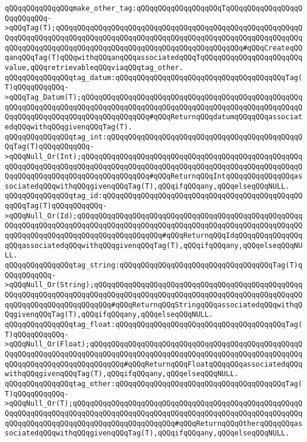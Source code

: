 \verb|qQQqqQQqqQQqqQQqmake_other_tag:qQQqqQQqqQQqqQQqqQQqTqQQqqQQqqQQqqQQqqQQqqQQqqQQq->qQQqTag(T);qQQqqQQqqQQqqQQqqQQqqQQqqQQqqQQqqQQqqQQqqQQqqQQqqQQqqQQqqQQqqQQqqQQqqQQqqQQqqQQqqQQqqQQqqQQqqQQqqQQqqQQqqQQqqQQqqQQqqQQqqQQqqQQqqQQqqQQqqQQqqQQqqQQqqQQqqQQqqQQqqQQqqQQqqQQqqQQqqQQqqQQq#qQQqCreateqQQqanqQQqTag(T)qQQqwithqQQqanqQQqassociatedqQQqTqQQqqQQqqQQqqQQqqQQqqQQqvalue,qQQqretrievableqQQqviaqQQqtag_other.|\newline
\newline
\verb|qQQqqQQqqQQqqQQqtag_datum:qQQqqQQqqQQqqQQqqQQqqQQqqQQqqQQqqQQqqQQqTag(T)qQQqqQQqqQQq->qQQqTag_Datum(T);qQQqqQQqqQQqqQQqqQQqqQQqqQQqqQQqqQQqqQQqqQQqqQQqqQQqqQQqqQQqqQQqqQQqqQQqqQQqqQQqqQQqqQQqqQQqqQQqqQQqqQQqqQQqqQQqqQQqqQQqqQQqqQQqqQQqqQQqqQQqqQQqqQQqqQQqqQQq#qQQqReturnqQQqdatumqQQqqQQqassociatedqQQqwithqQQqgivenqQQqTag(T).|\newline
\verb|qQQqqQQqqQQqqQQqtag_int:qQQqqQQqqQQqqQQqqQQqqQQqqQQqqQQqqQQqqQQqqQQqqQQqTag(T)qQQqqQQqqQQq->qQQqNull_Or(Int);qQQqqQQqqQQqqQQqqQQqqQQqqQQqqQQqqQQqqQQqqQQqqQQqqQQqqQQqqQQqqQQqqQQqqQQqqQQqqQQqqQQqqQQqqQQqqQQqqQQqqQQqqQQqqQQqqQQqqQQqqQQqqQQqqQQqqQQqqQQqqQQqqQQqqQQqqQQq#qQQqReturnqQQqIntqQQqqQQqqQQqqQQqassociatedqQQqwithqQQqgivenqQQqTag(T),qQQqifqQQqany,qQQqelseqQQqNULL.|\newline
\verb|qQQqqQQqqQQqqQQqtag_id:qQQqqQQqqQQqqQQqqQQqqQQqqQQqqQQqqQQqqQQqqQQqqQQqqQQqTag(T)qQQqqQQqqQQq->qQQqNull_Or(Id);qQQqqQQqqQQqqQQqqQQqqQQqqQQqqQQqqQQqqQQqqQQqqQQqqQQqqQQqqQQqqQQqqQQqqQQqqQQqqQQqqQQqqQQqqQQqqQQqqQQqqQQqqQQqqQQqqQQqqQQqqQQqqQQqqQQqqQQqqQQqqQQqqQQqqQQqqQQqqQQq#qQQqReturnqQQqIdqQQqqQQqqQQqqQQqqQQqassociatedqQQqwithqQQqgivenqQQqTag(T),qQQqifqQQqany,qQQqelseqQQqNULL.|\newline
\verb|qQQqqQQqqQQqqQQqtag_string:qQQqqQQqqQQqqQQqqQQqqQQqqQQqqQQqqQQqTag(T)qQQqqQQqqQQq->qQQqNull_Or(String);qQQqqQQqqQQqqQQqqQQqqQQqqQQqqQQqqQQqqQQqqQQqqQQqqQQqqQQqqQQqqQQqqQQqqQQqqQQqqQQqqQQqqQQqqQQqqQQqqQQqqQQqqQQqqQQqqQQqqQQqqQQqqQQqqQQqqQQqqQQqqQQq#qQQqReturnqQQqStringqQQqassociatedqQQqwithqQQqgivenqQQqTag(T),qQQqifqQQqany,qQQqelseqQQqNULL.|\newline
\verb|qQQqqQQqqQQqqQQqtag_float:qQQqqQQqqQQqqQQqqQQqqQQqqQQqqQQqqQQqqQQqTag(T)qQQqqQQqqQQq->qQQqNull_Or(Float);qQQqqQQqqQQqqQQqqQQqqQQqqQQqqQQqqQQqqQQqqQQqqQQqqQQqqQQqqQQqqQQqqQQqqQQqqQQqqQQqqQQqqQQqqQQqqQQqqQQqqQQqqQQqqQQqqQQqqQQqqQQqqQQqqQQqqQQqqQQqqQQqqQQq#qQQqReturnqQQqFloatqQQqqQQqassociatedqQQqwithqQQqgivenqQQqTag(T),qQQqifqQQqany,qQQqelseqQQqNULL.|\newline
\verb|qQQqqQQqqQQqqQQqtag_other:qQQqqQQqqQQqqQQqqQQqqQQqqQQqqQQqqQQqqQQqTag(T)qQQqqQQqqQQq->qQQqNull_Or(T);qQQqqQQqqQQqqQQqqQQqqQQqqQQqqQQqqQQqqQQqqQQqqQQqqQQqqQQqqQQqqQQqqQQqqQQqqQQqqQQqqQQqqQQqqQQqqQQqqQQqqQQqqQQqqQQqqQQqqQQqqQQqqQQqqQQqqQQqqQQqqQQqqQQqqQQqqQQqqQQqqQQq#qQQqReturnqQQqOtherqQQqqQQqassociatedqQQqwithqQQqgivenqQQqTag(T),qQQqifqQQqany,qQQqelseqQQqNULL.|\newline
